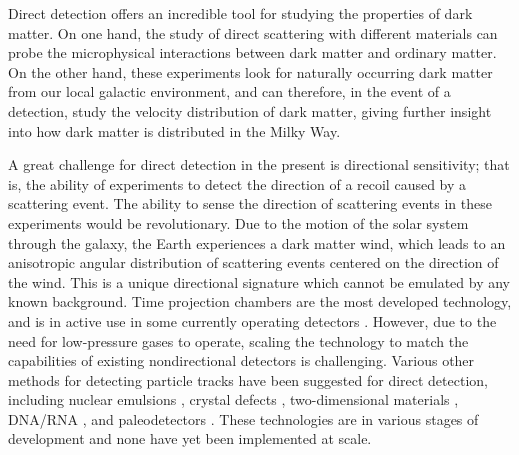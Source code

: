 \documentclass[b5paper, 10pt, twoside]{book}
\begin{document}
Direct detection offers an incredible tool for studying the properties of dark matter. On one hand, the study of direct scattering with different materials can probe the microphysical interactions between dark matter and ordinary matter. On the other hand, these experiments look for naturally occurring dark matter from our local galactic environment, and can therefore, in the event of a detection, study the velocity distribution of dark matter, giving further insight into how dark matter is distributed in the Milky Way.

A great challenge for direct detection in the present is directional sensitivity; that is, the ability of experiments to detect the direction of a recoil caused by a scattering event. The ability to sense the direction of scattering events in these experiments would be revolutionary. Due to the motion of the solar system through the galaxy, the Earth experiences a dark matter wind, which leads to an anisotropic angular distribution of scattering events centered on the direction of the wind. This is a unique directional signature which cannot be emulated by any known background. Time projection chambers are the most developed technology, and is in active use in some currently operating detectors \parencites{BattatEtAl2017, IkedaEtAl2021}. However, due to the need for low-pressure gases to operate, scaling the technology to match the capabilities of existing nondirectional detectors is challenging. Various other methods for detecting particle tracks have been suggested for direct detection, including nuclear emulsions \parencite{AgafonovaEtAl2018}, crystal defects \parencites{RajendranEtAl2017, MarshallEtAl2021}, two-dimensional materials \parencites{CapparelliEtAl2015, MarshallEtAl2021, BaracchiniEtAl2018}, DNA/RNA \parencites{DrukierEtAl2012, OHareEtAl2022}, and paleodetectors \parencite{BaumEtAl2020}. These technologies are in various stages of development and none have yet been implemented at scale.
\end{document}
